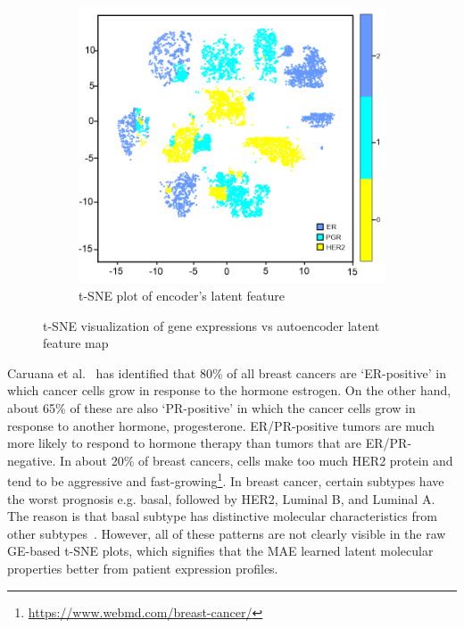 \begin{figure}
\begin{subfigure}{0.48\linewidth}
		\includegraphics[scale=0.7]{images/ae_tsne.png}
		\caption{t-SNE plot of encoder's latent feature}
        \label{fig:tsne_ae}
	\end{subfigure}
	 \setlength{\belowcaptionskip}{-8pt}
	\caption{t-SNE visualization of gene expressions vs autoencoder latent feature map~\cite{karimACCESS2019}} 
	\label{fig:tnse}
\end{figure}

\hspace*{3.5mm} Caruana et al.~\cite{91Caruana} has identified that 80\% of all breast cancers are `ER-positive' in which cancer cells grow in response to the hormone estrogen. On the other hand, about 65\% of these are also `PR-positive' in which the cancer cells grow in response to another hormone, progesterone. ER/PR-positive tumors are much more likely to respond to hormone therapy than tumors that are ER/PR-negative. In about 20\% of breast cancers, cells make too much HER2 protein and tend to be aggressive and fast-growing\footnote{\url{https://www.webmd.com/breast-cancer/}}. In breast cancer, certain subtypes have the worst prognosis e.g. basal, followed by HER2, Luminal B, and Luminal A. The reason is that basal subtype has distinctive molecular characteristics from other subtypes~\cite{bertucci2012basal}. However, all of these patterns are not clearly visible in the raw GE-based t-SNE plots, which signifies that the MAE learned latent molecular properties better from patient expression profiles.

